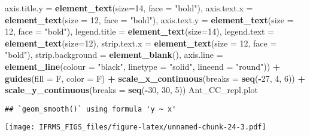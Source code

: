 \documentclass[
]{article}
\newenvironment{Shaded}{\begin{snugshade}}{\end{snugshade}}
\newcommand{\DataTypeTok}[1]{\textcolor[rgb]{0.13,0.29,0.53}{#1}}
\newcommand{\DecValTok}[1]{\textcolor[rgb]{0.00,0.00,0.81}{#1}}
\newcommand{\KeywordTok}[1]{\textcolor[rgb]{0.13,0.29,0.53}{\textbf{#1}}}
\newcommand{\NormalTok}[1]{#1}
\newcommand{\OperatorTok}[1]{\textcolor[rgb]{0.81,0.36,0.00}{\textbf{#1}}}
\newcommand{\StringTok}[1]{\textcolor[rgb]{0.31,0.60,0.02}{#1}}
\begin{document}
\begin{Shaded}
\begin{Highlighting}[]
        \DataTypeTok{axis.title.y =} \KeywordTok{element_text}\NormalTok{(}\DataTypeTok{size=}\DecValTok{14}\NormalTok{, }\DataTypeTok{face =} \StringTok{"bold"}\NormalTok{),}
        \DataTypeTok{axis.text.x =} \KeywordTok{element_text}\NormalTok{(}\DataTypeTok{size =} \DecValTok{12}\NormalTok{, }\DataTypeTok{face =} \StringTok{"bold"}\NormalTok{),}
        \DataTypeTok{axis.text.y =} \KeywordTok{element_text}\NormalTok{(}\DataTypeTok{size =} \DecValTok{12}\NormalTok{, }\DataTypeTok{face =} \StringTok{"bold"}\NormalTok{),}
        \DataTypeTok{legend.title =} \KeywordTok{element_text}\NormalTok{(}\DataTypeTok{size=}\DecValTok{14}\NormalTok{), }
        \DataTypeTok{legend.text =} \KeywordTok{element_text}\NormalTok{(}\DataTypeTok{size=}\DecValTok{12}\NormalTok{),}
        \DataTypeTok{strip.text.x =} \KeywordTok{element_text}\NormalTok{(}\DataTypeTok{size =} \DecValTok{12}\NormalTok{, }\DataTypeTok{face =} \StringTok{"bold"}\NormalTok{),}
        \DataTypeTok{strip.background =} \KeywordTok{element_blank}\NormalTok{(),}
        \DataTypeTok{axis.line =} \KeywordTok{element_line}\NormalTok{(}\DataTypeTok{colour =} \StringTok{"black"}\NormalTok{, }\DataTypeTok{linetype =} \StringTok{"solid"}\NormalTok{, }\DataTypeTok{lineend =} \StringTok{"round"}\NormalTok{)) }\OperatorTok{+}
\StringTok{  }\KeywordTok{guides}\NormalTok{(}\DataTypeTok{fill =}\NormalTok{ F, }\DataTypeTok{color =}\NormalTok{ F) }\OperatorTok{+}\StringTok{ }
\StringTok{  }\KeywordTok{scale_x_continuous}\NormalTok{(}\DataTypeTok{breaks =} \KeywordTok{seq}\NormalTok{(}\OperatorTok{-}\DecValTok{27}\NormalTok{, }\DecValTok{4}\NormalTok{, }\DecValTok{6}\NormalTok{)) }\OperatorTok{+}\StringTok{ }
\StringTok{  }\KeywordTok{scale_y_continuous}\NormalTok{(}\DataTypeTok{breaks =} \KeywordTok{seq}\NormalTok{(}\OperatorTok{-}\DecValTok{30}\NormalTok{, }\DecValTok{30}\NormalTok{, }\DecValTok{5}\NormalTok{))}
\NormalTok{Ant_CC_repl.plot}
\end{Highlighting}
\end{Shaded}

\begin{verbatim}
## `geom_smooth()` using formula 'y ~ x'
\end{verbatim}

\texttt{[image: IFRMS\_FIGS\_files/figure-latex/unnamed-chunk-24-3.pdf]}
\end{document}
